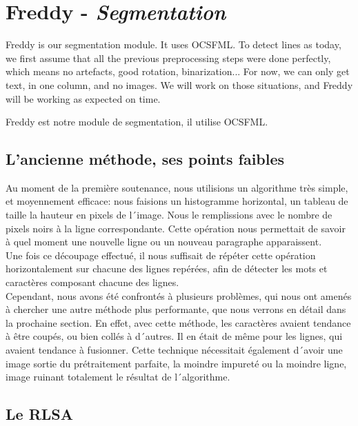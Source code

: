 \chapter{Freddy - \emph{Segmentation}}

Freddy is our segmentation module. It uses OCSFML.
To detect lines as today, we first assume that all the previous preprocessing steps were done perfectly, which means no artefacts, good rotation, binarization... For now, we can only get text, in one column, and no images. We will work on those situations, and Freddy will be working as expected on time.

Freddy est notre module de segmentation, il utilise OCSFML.

\section{L'ancienne méthode, ses points faibles}

Au moment de la première soutenance, nous utilisions un algorithme très simple, et moyennement efficace: nous faisions un histogramme horizontal, un tableau de taille la hauteur en pixels de l´image. Nous le remplissions avec le nombre de pixels noirs à la ligne correspondante. Cette opération nous permettait de savoir à quel moment une nouvelle ligne ou un nouveau paragraphe apparaissent.\\
Une fois ce découpage effectué, il nous suffisait de répéter cette opération horizontalement sur chacune des lignes repérées, afin de détecter les mots et caractères composant chacune des lignes.\\
Cependant, nous avons été confrontés à plusieurs problèmes, qui nous ont amenés à chercher une autre méthode plus performante, que nous verrons en détail dans la prochaine section. En effet, avec cette méthode, les caractères avaient tendance à être coupés, ou bien collés à d´autres. Il en était de même pour les lignes, qui avaient tendance à fusionner. Cette technique nécessitait également d´avoir une image sortie du prétraitement parfaite, la moindre impureté ou la moindre ligne, image ruinant totalement le résultat de l´algorithme.

\section{Le RLSA}

